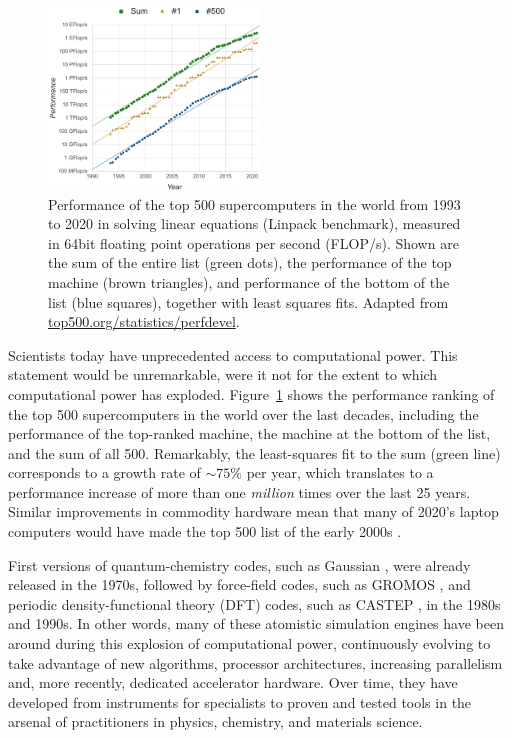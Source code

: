 \documentclass[9pt,review]{livecoms}
\begin{document}
\begin{figure}
    \includegraphics[width=0.5\textwidth]{figures/top500/top500-fit_v3}
    \caption{
        Performance of the top 500 supercomputers in the world from 1993 to 2020 in solving linear equations (Linpack benchmark), measured in 64bit floating point operations per second (FLOP/s).
        Shown are the sum of the entire list (green dots), the performance of the top machine (brown triangles), and performance of the bottom of the list (blue squares), together with least squares fits.
        Adapted from \href{https://www.top500.org/statistics/perfdevel/}{top500.org/statistics/perfdevel}.
    }
    \label{fig:top500}
\end{figure}


Scientists today have unprecedented access to computational power.
This statement would be unremarkable, were it not for the extent to which computational power has exploded.
Figure~\ref{fig:top500} shows the performance ranking of the top 500 supercomputers in the world over the last decades, including the performance of the top-ranked machine, the machine at the bottom of the list, and the sum of all 500.
Remarkably, the least-squares fit to the sum (green line) corresponds to a growth rate of ${\sim}75\%$ per year, which translates to a performance increase of more than one \emph{million} times over the last 25 years.
Similar improvements in commodity hardware mean that many of 2020's laptop computers would have made the top 500 list of the early 2000s \cite{Lehtola2021}.

First versions of quantum-chemistry codes, such as Gaussian \cite{Hehre1970}, 
were already released in the 1970s,
followed by force-field codes, such as GROMOS \cite{vanGunsteren1982}, 
and periodic density-functional theory (DFT) codes, such as CASTEP \cite{Payne1992a}, in the 1980s and 1990s.
In other words, many of these atomistic simulation engines have been around during this explosion of computational power, continuously evolving to take advantage of new algorithms, processor architectures, increasing parallelism and, more recently, dedicated accelerator hardware.
Over time, they have developed from instruments for specialists to proven and tested tools in the arsenal of practitioners in physics, chemistry, and materials science.
\end{document}
